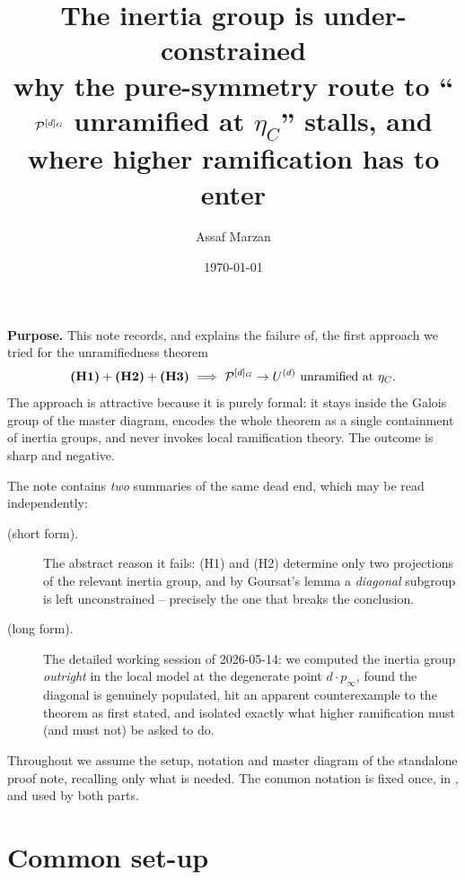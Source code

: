 \documentclass[11pt]{article}
\title{The inertia group is under-constrained\\[2pt]
       {\large why the pure-symmetry route to ``$\mathcal{P}^{[d]_G}$ unramified at
        $\eta_C$'' stalls, and where higher ramification has to enter}}
\author{Assaf Marzan}
\date{\today}
\begin{document}
\maketitle

\noindent\textbf{Purpose.}
This note records, and explains the failure of, the first approach we tried
for the unramifiedness theorem
\[
\textbf{(H1)} + \textbf{(H2)} + \textbf{(H3)}\ \Longrightarrow\
\cP^{[d]_G}\to U^{(d)}\ \text{unramified at}\ \eta_C .
\]
The approach is attractive because it is purely formal: it stays inside the
Galois group of the master diagram, encodes the whole theorem as a single
containment of inertia groups, and never invokes local ramification theory.
The outcome is sharp and negative.

The note contains \emph{two} summaries of the same dead end, which may be read
independently:
\begin{description}
  \item[ (short form).] The abstract reason it fails: (H1) and
        (H2) determine only two projections of the relevant inertia group, and
        by Goursat's lemma a \emph{diagonal} subgroup is left unconstrained --
        precisely the one that breaks the conclusion.
  \item[ (long form).] The detailed working session of
        2026-05-14: we computed the inertia group \emph{outright} in the local
        model at the degenerate point $d\cdot p_\infty$, found the diagonal is
        genuinely populated, hit an apparent counterexample to the theorem as
        first stated, and isolated exactly what higher ramification must (and
        must not) be asked to do.
\end{description}
Throughout we assume the setup, notation and master diagram of the standalone
proof note, recalling only what is needed. The common notation is fixed once,
in \Cref{sec:recall}, and used by both parts.

\section{Common set-up}\label{sec:recall}
\end{document}
